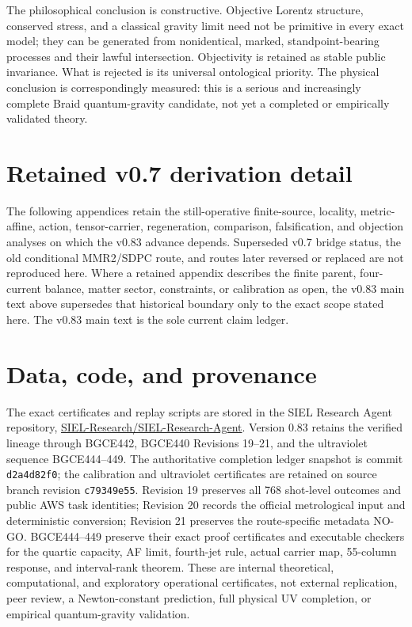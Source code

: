 \documentclass[11pt]{article}
\theoremstyle{definition}
\theoremstyle{remark}
\begin{document}
The philosophical conclusion is constructive. Objective Lorentz structure, conserved stress, and a classical gravity limit need not be primitive in every exact model; they can be generated from nonidentical, marked, standpoint-bearing processes and their lawful intersection. Objectivity is retained as stable public invariance. What is rejected is its universal ontological priority. The physical conclusion is correspondingly measured: this is a serious and increasingly complete Braid quantum-gravity candidate, not yet a completed or empirically validated theory.

\appendix
\section*{Retained v0.7 derivation detail}

The following appendices retain the still-operative finite-source, locality, metric-affine, action, tensor-carrier, regeneration, comparison, falsification, and objection analyses on which the v0.83 advance depends. Superseded v0.7 bridge status, the old conditional MMR2/SDPC route, and routes later reversed or replaced are not reproduced here. Where a retained appendix describes the finite parent, four-current balance, matter sector, constraints, or calibration as open, the v0.83 main text above supersedes that historical boundary only to the exact scope stated here. The v0.83 main text is the sole current claim ledger.



\section*{Data, code, and provenance}

The exact certificates and replay scripts are stored in the SIEL Research Agent repository,
\href{https://github.com/SIEL-Research/SIEL-Research-Agent}{SIEL-Research/SIEL-Research-Agent}. Version 0.83 retains the verified lineage through BGCE442, BGCE440 Revisions 19--21, and the ultraviolet sequence BGCE444--449. The authoritative completion ledger snapshot is commit \texttt{d2a4d82f0}; the calibration and ultraviolet certificates are retained on source branch revision \texttt{c79349e55}. Revision 19 preserves all 768 shot-level outcomes and public AWS task identities; Revision 20 records the official metrological input and deterministic conversion; Revision 21 preserves the route-specific metadata NO-GO. BGCE444--449 preserve their exact proof certificates and executable checkers for the quartic capacity, AF limit, fourth-jet rule, actual carrier map, 55-column response, and interval-rank theorem. These are internal theoretical, computational, and exploratory operational certificates, not external replication, peer review, a Newton-constant prediction, full physical UV completion, or empirical quantum-gravity validation.
\end{document}
